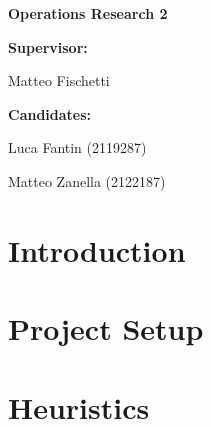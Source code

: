 \documentclass[a4paper,12pt]{report}
\newcommand\blankpage{%
    \null
    \thispagestyle{empty}%
    \addtocounter{page}{-1}%
    \newpage}
\begin{document}
\begin{titlepage}
\begin{center}
\textbf{\large Operations Research 2}\\
\vfill

\raggedright\textbf{\large Supervisor:} \\
\raggedright\large Matteo Fischetti\\
\vfill
\raggedright\textbf{\large Candidates:} \\
\raggedright\large Luca Fantin (2119287)  \\
\raggedright\large Matteo Zanella (2122187)\\

\vfill
{}

\end{center}
\end{titlepage}

    

    

\clearpage{\pagestyle{plain}\cleardoublepage}
\tableofcontents

\clearpage{\pagestyle{plain}\cleardoublepage}


\clearpage{\pagestyle{plain}\cleardoublepage}
\chapter{Introduction}


\clearpage{\pagestyle{plain}\cleardoublepage}
\chapter{Project Setup}


\clearpage{\pagestyle{plain}\cleardoublepage}
\chapter{Heuristics}

\end{document}
